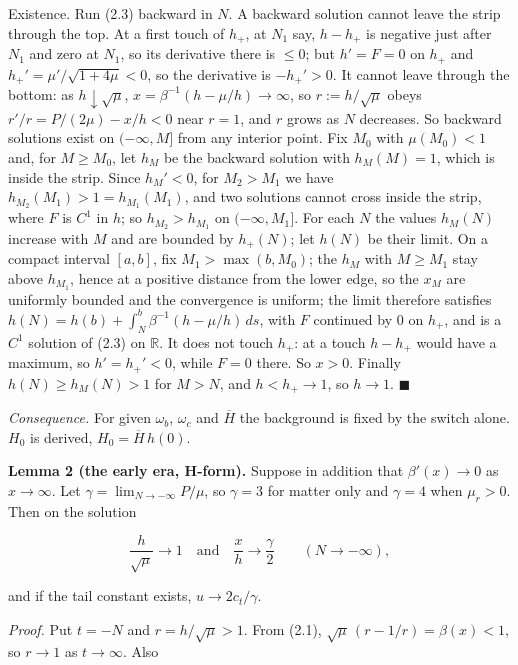 \documentclass[11pt,a4paper]{article}
\begin{document}
Existence. Run (2.3) backward in $N$. A backward solution cannot leave the strip through the top. At a first touch
of $h_+$, at $N_1$ say, $h - h_+$ is negative just after $N_1$ and zero at $N_1$, so its derivative there is $\le 0$;
but $h' = F = 0$ on $h_+$ and $h_+' = \mu'/\sqrt{1 + 4\mu} < 0$, so the derivative is $-h_+' > 0$. It cannot leave
through the bottom: as $h \downarrow \sqrt\mu$, $x = \beta^{-1}(h - \mu/h) \to \infty$, so $r := h/\sqrt\mu$ obeys
$r'/r = P/(2\mu) - x/h < 0$ near $r = 1$, and $r$ grows as $N$ decreases. So backward solutions exist on
$(-\infty, M]$ from any interior point. Fix $M_0$ with $\mu(M_0) < 1$ and, for $M \ge M_0$, let $h_M$ be the backward
solution with $h_M(M) = 1$, which is inside the strip. Since $h_M' < 0$, for $M_2 > M_1$ we have
$h_{M_2}(M_1) > 1 = h_{M_1}(M_1)$, and two solutions cannot cross inside the strip, where $F$ is $C^1$ in $h$; so
$h_{M_2} > h_{M_1}$ on $(-\infty, M_1]$. For each $N$ the values $h_M(N)$ increase with $M$ and are bounded by
$h_+(N)$; let $h(N)$ be their limit. On a compact interval $[a, b]$, fix $M_1 > \max(b, M_0)$; the $h_M$ with
$M \ge M_1$ stay above $h_{M_1}$, hence at a positive distance from the lower edge, so the $x_M$ are uniformly bounded and the convergence is
uniform; the limit therefore satisfies $h(N) = h(b) + \int_N^b \beta^{-1}(h - \mu/h)\,ds$, with $F$ continued by 0 on
$h_+$, and is a $C^1$ solution of (2.3) on $\mathbb{R}$. It does not touch $h_+$: at a touch $h - h_+$ would have a
maximum, so $h' = h_+' < 0$, while $F = 0$ there. So $x > 0$. Finally $h(N) \ge h_M(N) > 1$ for $M > N$, and
$h < h_+ \to 1$, so $h \to 1$. \hfill$\blacksquare$

\emph{Consequence.} For given $\omega_b$, $\omega_c$ and $\overline{H}$ the background is fixed by the switch alone. $H_0$ is
derived, $H_0 = \overline{H}\,h(0)$.

{\bfseries\boldmath Lemma 2 (the early era, H-form).} Suppose in addition that $\beta'(x) \to 0$ as $x \to \infty$. Let
$\gamma = \lim_{N\to-\infty} P/\mu$, so $\gamma = 3$ for matter only and $\gamma = 4$ when $\mu_r > 0$. Then on the solution


\begin{equation*}
\frac{h}{\sqrt\mu} \to 1 \quad\text{and}\quad \frac{x}{h} \to \frac{\gamma}{2} \qquad (N \to -\infty),
\end{equation*}


and if the tail constant exists, $u \to 2c_t/\gamma$.

\emph{Proof.} Put $t = -N$ and $r = h/\sqrt\mu > 1$. From (2.1), $\sqrt\mu\,(r - 1/r) = \beta(x) < 1$, so $r \to 1$ as
$t \to \infty$. Also
\end{document}
